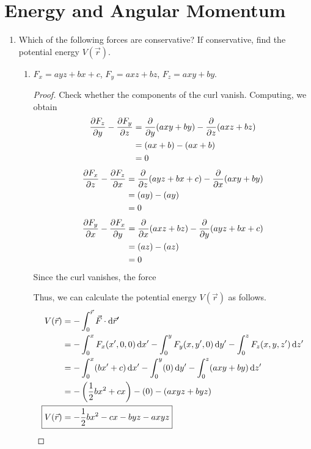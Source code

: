 \documentclass[../psets.tex]{subfiles}
\begin{document}
\section{Energy and Angular Momentum}
\begin{enumerate}
    \item {}Which of the following forces are conservative? If conservative, find the potential energy $V(\vec{r})$.
    \begin{enumerate}
        \item $F_x=ayz+bx+c$, $F_y=axz+bz$, $F_z=axy+by$.
        \begin{proof}
            Check whether the components of the curl vanish. Computing, we obtain
            \begin{align*}
                \pdv{F_z}{y}-\pdv{F_y}{z} &= \pdv{y}(axy+by)-\pdv{z}(axz+bz)\\
                &= (ax+b)-(ax+b)\\
                &= 0
            \end{align*}
            \begin{align*}
                \pdv{F_x}{z}-\pdv{F_z}{x} &= \pdv{z}(ayz+bx+c)-\pdv{x}(axy+by)\\
                &= (ay)-(ay)\\
                &= 0
            \end{align*}
            \begin{align*}
                \pdv{F_y}{x}-\pdv{F_x}{y} &= \pdv{x}(axz+bz)-\pdv{y}(ayz+bx+c)\\
                &= (az)-(az)\\
                &= 0
            \end{align*}
            Since the curl vanishes, the force \par
            Thus, we can calculate the potential energy $V(\vec{r})$ as follows.
            \begin{align*}
                V(\vec{r}) &= -\int_0^{\vec{r}}\vec{F}\cdot\dd\vec{r}'\\
                &= -\int_0^xF_x(x',0,0)\dd{x'}-\int_0^yF_y(x,y',0)\dd{y'}-\int_0^zF_z(x,y,z')\dd{z'}\\
                &= -\int_0^x(bx'+c)\dd{x'}-\int_0^y(0)\dd{y'}-\int_0^z(axy+by)\dd{z'}\\
                &= -\left( \frac{1}{2}bx^2+cx \right)-(0)-(axyz+byz)\\
                \Aboxed{V(\vec{r}) &= -\frac{1}{2}bx^2-cx-byz-axyz}
            \end{align*}

\end{proof}
\end{enumerate}
\end{enumerate}
\end{document}
